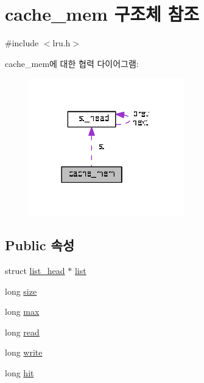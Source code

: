 \hypertarget{structcache__mem}{\section{cache\+\_\+mem 구조체 참조}
\label{structcache__mem}
}


{\ttfamily \#include $<$lru.\+h$>$}



cache\+\_\+mem에 대한 협력 다이어그램\+:\nopagebreak
\begin{figure}[H]
\begin{center}
\leavevmode
\includegraphics[width=190pt]{structcache__mem__coll__graph}
\end{center}
\end{figure}
\subsection*{Public 속성}
\begin{DoxyCompactItemize}
\item 
struct \hyperlink{structlist__head}{list\+\_\+head} $\ast$ \hyperlink{structcache__mem_a785dde86afb87f8825779f50e29d6bd7}{list}
\item 
long \hyperlink{structcache__mem_a58c6a91c40d59398a3ed18daccc448fc}{size}
\item 
long \hyperlink{structcache__mem_aca41dfab3073387e6c6063457a17f616}{max}
\item 
long \hyperlink{structcache__mem_af64061b621392a1872f5cb92dde7dc7c}{read}
\item 
long \hyperlink{structcache__mem_adb5a0315176779908235c7ed3e41ec57}{write}
\item 
long \hyperlink{structcache__mem_a2b8742701cf4beaff0639d36d52209d9}{hit}
\end{DoxyCompactItemize}


